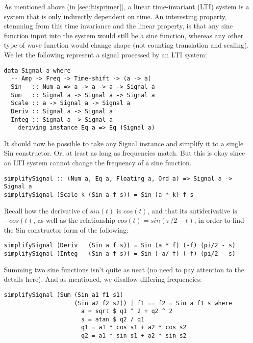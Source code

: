 As mentioned above (in \ref{sec:ltisprimer}), a linear time-invariant (LTI) system is a system that is only indirectly dependent on time. \iffalse More precisely, input signals may be linearly combined (superposed) or differentiated/integrated with respect to time. 
(As discussed (in \ref{sec:tf}), we can describe how an LTI system transforms an input signal to the output signal with a transfer function).\fi
An interesting property, stemming from this time invariance and the linear property, is that any sine function input into the system would still be a sine function, whereas any other type of wave function would change shape (not counting translation and scaling).
We let the following represent a signal processed by an LTI system:
\begin{verbatim}
data Signal a where
  -- Amp -> Freq -> Time-shift -> (a -> a)
  Sin   :: Num a => a -> a -> a -> Signal a
  Sum   :: Signal a -> Signal a -> Signal a
  Scale :: a -> Signal a -> Signal a
  Deriv :: Signal a -> Signal a
  Integ :: Signal a -> Signal a
    deriving instance Eq a => Eq (Signal a)
\end{verbatim}
It should now be possible to take any Signal instance and simplify it to a single Sin constructor. Or, at least as long as frequencies match. But this is okay since an LTI system cannot change the frequency of a sine function.
\begin{verbatim}
simplifySignal :: (Num a, Eq a, Floating a, Ord a) => Signal a -> Signal a
simplifySignal (Scale k (Sin a f s)) = Sin (a * k) f s
\end{verbatim}
Recall how the derivative of $sin(t)$ is $cos(t)$, and that its antiderivative is $-cos(t)$, as well as the relationship $cos(t)=sin(\pi/2-t)$, in order to find the Sin constructor form of the following:
\begin{verbatim}
simplifySignal (Deriv   (Sin a f s)) = Sin (a * f) (-f) (pi/2 - s)
simplifySignal (Integ   (Sin a f s)) = Sin (-a/ f) (-f) (pi/2 - s)
\end{verbatim}
Summing two sine functions isn't quite as neat (no need to pay attention to the details here). And as mentioned, we disallow differing frequencies:
\begin{verbatim}
simplifySignal (Sum (Sin a1 f1 s1)
                    (Sin a2 f2 s2)) | f1 == f2 = Sin a f1 s where
                      a = sqrt $ q1 ^ 2 + q2 ^ 2
                      s = atan $ q2 / q1
                      q1 = a1 * cos s1 + a2 * cos s2
                      q2 = a1 * sin s1 + a2 * sin s2
\end{verbatim}
